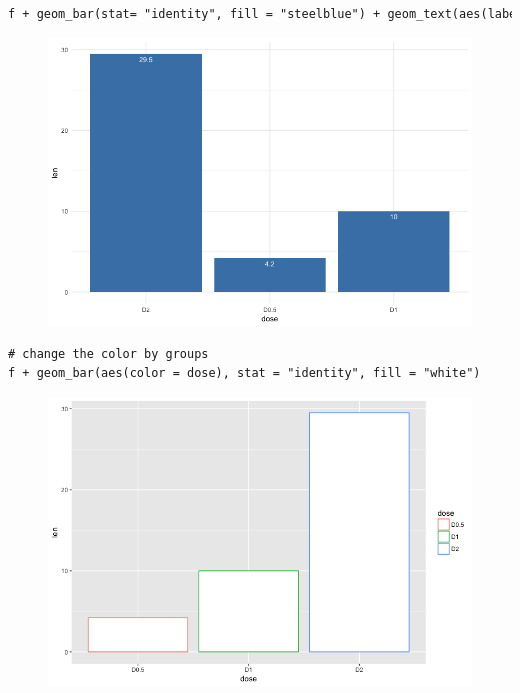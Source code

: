 \begin{lstlisting}[language=html]
f + geom_bar(stat= "identity", fill = "steelblue") + geom_text(aes(label = len), vjust = 1.6, size = 3.5, color = "white") + theme_minimal() + scale_x_discrete(limits = c("D2", "D0.5", "D1"))
\end{lstlisting}
\begin{figure}[H]\begin{center}\includegraphics[scale=1 ]{ilu/bg132.png}\end{center}\end{figure}
\begin{lstlisting}[language=html]
# change the color by groups
f + geom_bar(aes(color = dose), stat = "identity", fill = "white")
\end{lstlisting}
\begin{figure}[H]\begin{center}\includegraphics[scale=1 ]{ilu/bg133.png}\end{center}\end{figure}
